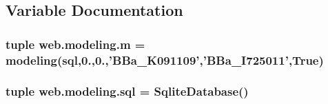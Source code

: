 \subsection{Variable Documentation}
\hypertarget{namespaceweb_1_1modeling_a1bc5ee3cb21ab5b881af5cb7caa7a256}{
\subsubsection[{m}]{\setlength{\rightskip}{0pt plus 5cm}tuple web.\-modeling.\-m = {\bf modeling}({\bf sql},0.,0.,'B\-Ba\-\_\-\-K091109','B\-Ba\-\_\-\-I725011',True)}}\label{namespaceweb_1_1modeling_a1bc5ee3cb21ab5b881af5cb7caa7a256}
\hypertarget{namespaceweb_1_1modeling_a5d36bb88ac240bdc558e50c0262671f8}{
\subsubsection[{sql}]{\setlength{\rightskip}{0pt plus 5cm}tuple web.\-modeling.\-sql = Sqlite\-Database()}}\label{namespaceweb_1_1modeling_a5d36bb88ac240bdc558e50c0262671f8}

